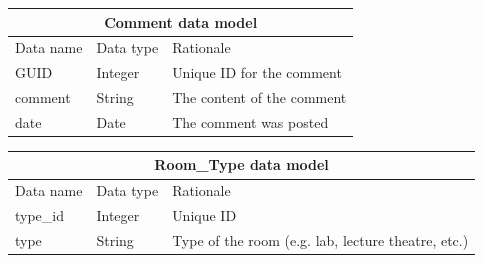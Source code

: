 \documentclass{sig-alt-release2}
\begin{document}
\vspace{1em}

\begin{tabular}{| p{1.8cm} | p{1cm} | p{4.2cm}|}
\hline
\multicolumn{3}{|c|}{\textbf{Comment data model}} \\
\hline
Data name & Data type & Rationale \\
\hline
GUID & Integer & Unique ID for the comment\\
\hline
comment & String & The content of the comment\\
\hline
date & Date & The comment was posted\\
\hline
\end{tabular}	

\vspace{1em}

\begin{tabular}{| p{1.8cm} | p{1cm} | p{4.2cm}|}
\hline
\multicolumn{3}{|c|}{\textbf{Room\_Type data model}} \\
\hline
Data name & Data type & Rationale \\
\hline
type\_id & Integer & Unique ID \\
\hline
type & String & Type of the room (e.g. lab, lecture theatre, etc.)\\
\hline
\end{tabular}	

\vspace{1em}
\end{document}
